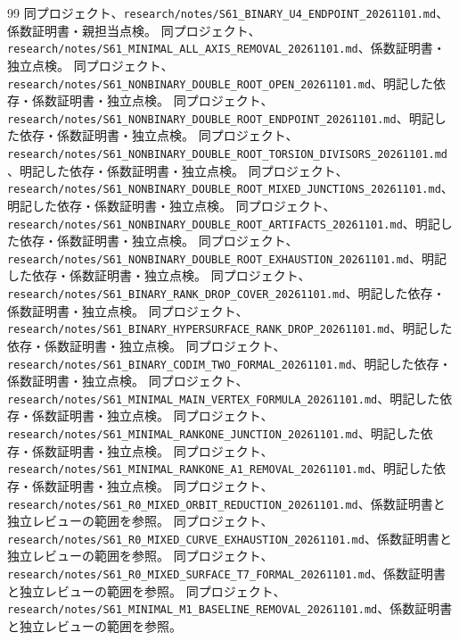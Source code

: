 \documentclass[11pt,a4paper]{ltjsarticle}
\theoremstyle{remark}
\begin{document}
\begin{thebibliography}{99}
 同プロジェクト、\nolinkurl{research/notes/S61_BINARY_U4_ENDPOINT_20261101.md}、係数証明書・親担当点検。
 同プロジェクト、\nolinkurl{research/notes/S61_MINIMAL_ALL_AXIS_REMOVAL_20261101.md}、係数証明書・独立点検。
 同プロジェクト、\nolinkurl{research/notes/S61_NONBINARY_DOUBLE_ROOT_OPEN_20261101.md}、明記した依存・係数証明書・独立点検。
 同プロジェクト、\nolinkurl{research/notes/S61_NONBINARY_DOUBLE_ROOT_ENDPOINT_20261101.md}、明記した依存・係数証明書・独立点検。
 同プロジェクト、\nolinkurl{research/notes/S61_NONBINARY_DOUBLE_ROOT_TORSION_DIVISORS_20261101.md}、明記した依存・係数証明書・独立点検。
 同プロジェクト、\nolinkurl{research/notes/S61_NONBINARY_DOUBLE_ROOT_MIXED_JUNCTIONS_20261101.md}、明記した依存・係数証明書・独立点検。
 同プロジェクト、\nolinkurl{research/notes/S61_NONBINARY_DOUBLE_ROOT_ARTIFACTS_20261101.md}、明記した依存・係数証明書・独立点検。
 同プロジェクト、\nolinkurl{research/notes/S61_NONBINARY_DOUBLE_ROOT_EXHAUSTION_20261101.md}、明記した依存・係数証明書・独立点検。
 同プロジェクト、\nolinkurl{research/notes/S61_BINARY_RANK_DROP_COVER_20261101.md}、明記した依存・係数証明書・独立点検。
 同プロジェクト、\nolinkurl{research/notes/S61_BINARY_HYPERSURFACE_RANK_DROP_20261101.md}、明記した依存・係数証明書・独立点検。
 同プロジェクト、\nolinkurl{research/notes/S61_BINARY_CODIM_TWO_FORMAL_20261101.md}、明記した依存・係数証明書・独立点検。
 同プロジェクト、\nolinkurl{research/notes/S61_MINIMAL_MAIN_VERTEX_FORMULA_20261101.md}、明記した依存・係数証明書・独立点検。
 同プロジェクト、\nolinkurl{research/notes/S61_MINIMAL_RANKONE_JUNCTION_20261101.md}、明記した依存・係数証明書・独立点検。
 同プロジェクト、\nolinkurl{research/notes/S61_MINIMAL_RANKONE_A1_REMOVAL_20261101.md}、明記した依存・係数証明書・独立点検。
 同プロジェクト、\nolinkurl{research/notes/S61_R0_MIXED_ORBIT_REDUCTION_20261101.md}、係数証明書と独立レビューの範囲を参照。
 同プロジェクト、\nolinkurl{research/notes/S61_R0_MIXED_CURVE_EXHAUSTION_20261101.md}、係数証明書と独立レビューの範囲を参照。
 同プロジェクト、\nolinkurl{research/notes/S61_R0_MIXED_SURFACE_T7_FORMAL_20261101.md}、係数証明書と独立レビューの範囲を参照。
 同プロジェクト、\nolinkurl{research/notes/S61_MINIMAL_M1_BASELINE_REMOVAL_20261101.md}、係数証明書と独立レビューの範囲を参照。

\end{thebibliography}
\end{document}
